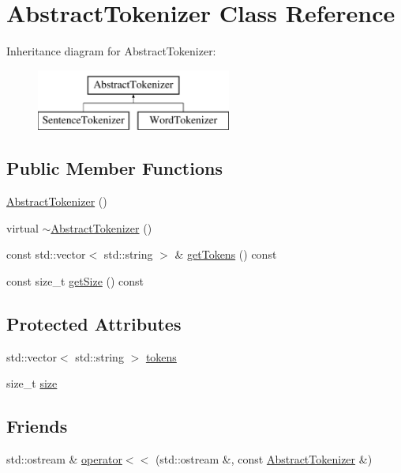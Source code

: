 \hypertarget{classAbstractTokenizer}{\section{Abstract\-Tokenizer Class Reference}
\label{classAbstractTokenizer}
}
Inheritance diagram for Abstract\-Tokenizer\-:\begin{figure}[H]
\begin{center}
\leavevmode
\includegraphics[height=2.000000cm]{classAbstractTokenizer}
\end{center}
\end{figure}
\subsection*{Public Member Functions}
\begin{DoxyCompactItemize}
\item 
\hyperlink{classAbstractTokenizer_ad5dd529f11552a1bb522f97077148270}{Abstract\-Tokenizer} ()
\item 
virtual \hyperlink{classAbstractTokenizer_ac9005dbf8971809768ddfeea2db3e3a9}{$\sim$\-Abstract\-Tokenizer} ()
\item 
const std\-::vector$<$ std\-::string $>$ \& \hyperlink{classAbstractTokenizer_a173d035845636f70443f332ae30f18a3}{get\-Tokens} () const 
\item 
const size\-\_\-t \hyperlink{classAbstractTokenizer_a1ad30170d36ff3b815aa77c20eb9f8b9}{get\-Size} () const 
\end{DoxyCompactItemize}
\subsection*{Protected Attributes}
\begin{DoxyCompactItemize}
\item 
std\-::vector$<$ std\-::string $>$ \hyperlink{classAbstractTokenizer_a76c3d1105c591f92f1036c327acd36f3}{tokens}
\item 
size\-\_\-t \hyperlink{classAbstractTokenizer_a25d4d9be114e714ac362dd64991e0f65}{size}
\end{DoxyCompactItemize}
\subsection*{Friends}
\begin{DoxyCompactItemize}
\item 
std\-::ostream \& \hyperlink{classAbstractTokenizer_afe537fa967b2a1d1db799e201b4007fa}{operator$<$$<$} (std\-::ostream \&, const \hyperlink{classAbstractTokenizer}{Abstract\-Tokenizer} \&)
\end{DoxyCompactItemize}


